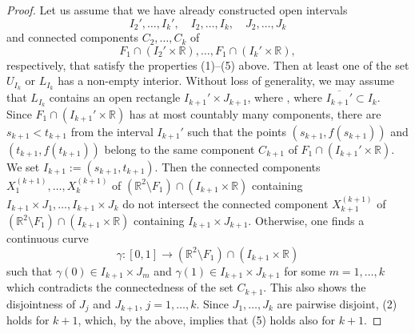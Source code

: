 \documentclass[a4paper,10pt]{amsart}
\newtheorem*{crucial lemma}{Lemma \ref{lem:nice polynomial2}}
\theoremstyle{definition}
\newcommand{\R}{\mathbb{R}}
\begin{document}
\begin{proof}
Let us assume that we have already constructed  open intervals 
\[I_2',\ldots,I_k',\quad I_2,\ldots,I_k, \quad J_2,\ldots,J_k\] 
and connected components $C_2,\ldots, C_k$ of 
\[F_1\cap(I_2'\times \R),\ldots,F_1\cap(I_k'\times \R),\]
respectively, that satisfy the properties (1)--(5) above.
Then at least one of the set $U_{I_k}$ or $L_{I_k}$ has a non-empty interior. Without loss of generality, we may assume that $L_{I_k}$ contains an open rectangle $I_{k+1}'\times J_{k+1}$, where , where $\overline{I_{k+1}'}\subset I_k$. Since $F_1\cap(I_{k+1}'\times \R)$ has at most countably many components, there are $s_{k+1}<t_{k+1}$ from the interval $I_{k+1}'$ such that the points $(s_{k+1},f(s_{k+1}))$ and $(t_{k+1},f(t_{k+1}))$ belong to the same component $C_{k+1}$ of $F_1\cap(I_{k+1}'\times \R)$. We set $I_{k+1}:=(s_{k+1},t_{k+1})$. Then the connected components $X_1^{(k+1)},\ldots, X_{k}^{(k+1)}$ of $(\R^2\setminus F_1)\cap(I_{k+1}\times\R)$ containing $I_{k+1}\times J_1,\ldots,I_{k+1}\times J_{k}$ do not intersect the connected component $X_{k+1}^{(k+1)}$ of $(\R^2\setminus F_1)\cap(I_{k+1}\times\R)$ containing $I_{k+1}\times J_{k+1}$. Otherwise, one finds a continuous curve 
\[\gamma\colon[0,1]\to (\R^2\setminus F_1)\cap (I_{k+1}\times\R)\]
such that $\gamma(0)\in I_{k+1}\times J_m$ and $\gamma(1)\in I_{k+1}\times J_{k+1}$ for some $m=1,\ldots, k$ which contradicts the connectedness of the set $C_{k+1}$. This also shows the disjointness of $J_j$ and $J_{k+1}$, $j=1,\ldots,k$. Since $J_1,\ldots,J_{k}$ are pairwise disjoint, (2) holds for $k+1$, which, by the above, implies that (5) holds also for $k+1$.


\end{proof}
\end{document}
